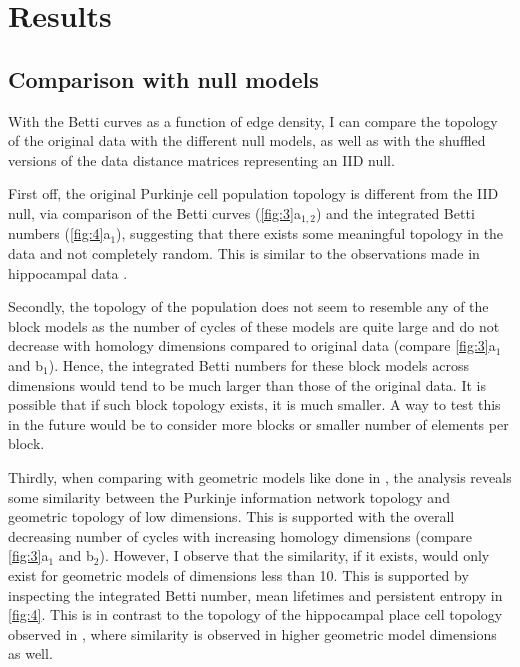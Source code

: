 \section{Results}

\subsection{Comparison with null models}



With the Betti curves as a function of edge density, I can compare the topology of the original data with the different null models, as well as with the shuffled versions of the data distance matrices representing an IID null.

First off, the original Purkinje cell population topology is different from the IID null, via comparison of the Betti curves (\autoref{fig:3}a$_{1,2}$) and the integrated Betti numbers (\autoref{fig:4}a$_{1}$), suggesting that there exists some meaningful topology in the data and not completely random. This is similar to the observations made in hippocampal data \cite{Giusti2015-uo}.



Secondly, the topology of the population does not seem to resemble any of the block models as the number of cycles of these models are quite large and do not decrease with homology dimensions compared to original data (compare \autoref{fig:3}a$_1$ and b$_1$). Hence, the integrated Betti numbers for these block models across dimensions would tend to be much larger than those of the original data. It is possible that if such block topology exists, it is much smaller. A way to test this in the future would be to consider more blocks or smaller number of elements per block.

Thirdly, when comparing with geometric models like done in \cite{Giusti2015-uo}, the analysis reveals some similarity between the Purkinje information network topology and geometric topology of low dimensions. This is supported with the overall decreasing number of cycles with increasing homology dimensions (compare \autoref{fig:3}a$_1$ and b$_2$). However, I observe that the similarity, if it exists, would only exist for geometric models of dimensions less than 10. This is supported by inspecting the integrated Betti number, mean lifetimes and persistent entropy in \autoref{fig:4}. This is in contrast to the topology of the hippocampal place cell topology observed in \cite{Giusti2015-uo}, where similarity is observed in higher geometric model dimensions as well.

